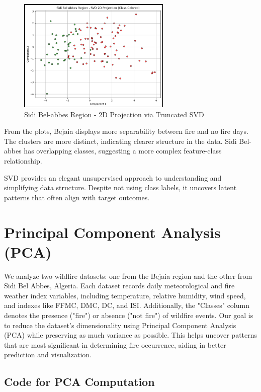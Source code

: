\documentclass[12pt]{article}
\begin{document}
\begin{figure}[h!]
    \centering
    \includegraphics[width=0.65\textwidth]{images/svd_pca_lda/sbar_svd.png}
    \caption{Sidi Bel-abbes Region - 2D Projection via Truncated SVD}
\end{figure}

From the plots, Bejaia displays more separability between fire and no fire days. The clusters are more distinct, indicating clearer structure in the data. Sidi Bel-abbes has overlapping classes, suggesting a more complex feature-class relationship.

SVD provides an elegant unsupervised approach to understanding and simplifying data structure. Despite not using class labels, it uncovers latent patterns that often align with target outcomes.








\newpage

\section*{Principal Component Analysis (PCA)}

We analyze two wildfire datasets: one from the Bejaia region and the other from Sidi Bel Abbes, Algeria. Each dataset records daily meteorological and fire weather index variables, including temperature, relative humidity, wind speed, and indexes like FFMC, DMC, DC, and ISI. Additionally, the "Classes" column denotes the presence ("fire") or absence ("not fire") of wildfire events. Our goal is to reduce the dataset's dimensionality using Principal Component Analysis (PCA) while preserving as much variance as possible. This helps uncover patterns that are most significant in determining fire occurrence, aiding in better prediction and visualization.

\subsection*{Code for PCA Computation}
\end{document}
